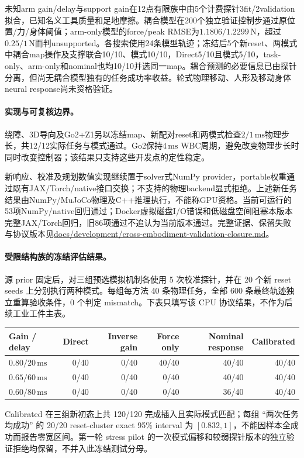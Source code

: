 未知arm gain/delay与support gain在12点有限族中由5个计费探针3fit/2validation拟合，已知名义工具质量和足地摩擦。耦合模型在200个独立验证控制步通过原位置/力/身体阈值；arm-only模型的force/peak RMSE为$1.1806/1.2299\,\mathrm N$，超过$0.25/1\,\mathrm N$而判unsupported。各搜索使用24条模型轨迹；冻结后5个新reset、两模式中耦合map操作及支撑联合10/10、模式10/10，Direct5/10且模式5/10，task-only、arm-only和nominal也均10/10并选同一map。耦合预测的必要信息已由探针分离，但尚无耦合模型独有的任务成功率收益。轮式物理移动、人形及移动身体neural response尚未资格验证。

\paragraph{实现与可复核边界。}
绕障、3D导向及Go2+Z1另以冻结map、新配对reset和两模式检查$2/1\,\mathrm{ms}$物理步长，共12/12实际任务与模式通过。Go2保持$4\,\mathrm{ms}$ WBC周期，避免改变物理步长时同时改变控制器；该结果只支持这些开发点的定性稳定。

新响应、校准及规划数值实现继续置于solver式NumPy provider，portable权重通过既有JAX/Torch/native接口交换；不支持的物理backend显式拒绝。上述新任务结果由NumPy/MuJoCo物理及C++推理执行，不能称GPU资格。当前可运行的53项NumPy/native回归通过；Docker虚拟磁盘I/O错误和低磁盘空间阻塞本版本完整JAX/Torch回归，旧86项通过不追认为当前版本通过。完整证据、保留失败与协议版本见\url{docs/development/cross-embodiment-validation-closure.md}。

\paragraph{受限结构族的冻结评估结果。}
源 prior 固定后，对三组预选模拟机制各使用 5 次校准探针，并在 20 个新 reset seeds 上分别执行两种模式。每组每方法 40 条物理任务，全部 600 条最终轨迹独立重算验收条件，0 个判定 mismatch。下表只填写该 CPU 协议结果，不作为后续工业工件主表。
\begin{center}
\small
\begin{tabular}{lrrrrr}
\toprule
Gain / delay & Direct & Inverse gain & Force only & Nominal response & Calibrated\\
\midrule
$0.80/20\,\mathrm{ms}$ & 0/40 & 0/40 & 40/40 & 40/40 & 40/40\\
$0.65/60\,\mathrm{ms}$ & 0/40 & 0/40 & 0/40 & 40/40 & 40/40\\
$0.60/80\,\mathrm{ms}$ & 0/40 & 0/40 & 0/40 & 36/40 & 40/40\\
\bottomrule
\end{tabular}
\end{center}
Calibrated 在三组新初态上共 120/120 完成插入且实际模式匹配；每组 ``两次任务均成功'' 的 20/20 reset-cluster exact 95\% interval 为 $[0.832,1]$，不能因样本全成功而报告零宽区间。第一轮 stress pilot 的一次模式偏移和较弱探针版本的独立验证拒绝均保留，不并入此冻结测试分母。

